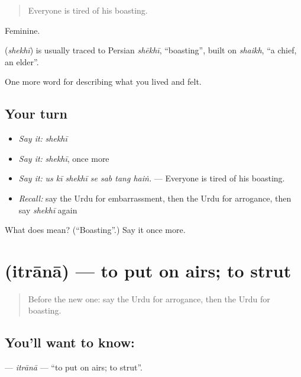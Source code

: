 \begin{quote}
Everyone is tired of his boasting.
\end{quote}

Feminine.

\begin{cousinweb}
\textbf{} (\emph{shekhī}) is usually traced to Persian \emph{shēkhī}, \textquotedblleft{}boasting\textquotedblright{}, built on \emph{shaikh}, \textquotedblleft{}a chief, an elder\textquotedblright{}.
\end{cousinweb}

\begin{grammarlens}[title={What you've built}]
One more word for describing what you lived and felt.
\end{grammarlens}

\subsection*{Your turn}
\begin{itemize}
\raggedright
  \item \emph{Say it:} \emph{shekhī}
  \item \emph{Say it:} \emph{shekhī}, once more
  \item \emph{Say it:} \emph{us kī shekhī se sab tang haiṅ.} — Everyone is tired of his boasting.
  \item \emph{Recall:} say the Urdu for embarrassment, then the Urdu for arrogance, then say \emph{shekhī} again
\end{itemize}

\begin{tcolorbox}[breakable,colback=teal!4,colframe=teal!35!black,title={Before you move on}]
What does  mean? (\textquotedblleft{}Boasting\textquotedblright{}.) Say it once more.
\end{tcolorbox}
\section[\texorpdfstring{\ur{اترانا} (itrānā)}{اترانا (itrānā)}]{ (itrānā) — to put on airs; to strut}

\label{lesson:UR-C452-itrana}



\begin{quote}
Before the new one: say the Urdu for arrogance, then the Urdu for boasting.
\end{quote}

\subsection*{You'll want to know: }
\textbf{} — \emph{itrānā} — \textquotedblleft{}to put on airs; to strut\textquotedblright{}.

